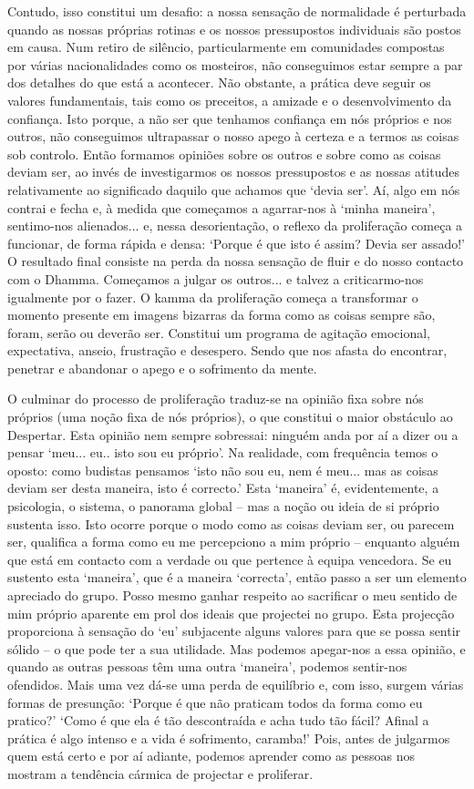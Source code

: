 Contudo, isso constitui um desafio: a nossa sensação de normalidade é perturbada quando as nossas próprias rotinas e os nossos pressupostos individuais são postos em causa. Num retiro de silêncio, particularmente em comunidades compostas por várias nacionalidades como os mosteiros, não conseguimos estar sempre a par dos detalhes do que está a acontecer. Não obstante, a prática deve seguir os valores fundamentais, tais como os preceitos, a amizade e o desenvolvimento da confiança. Isto porque, a não ser que tenhamos confiança em nós próprios e nos outros, não conseguimos ultrapassar o nosso apego à certeza e a termos as coisas sob controlo. Então formamos opiniões sobre os outros e sobre como as coisas deviam ser, ao invés de investigarmos os nossos pressupostos e as nossas atitudes relativamente ao significado daquilo que achamos que `devia ser'. Aí, algo em nós contrai e fecha e, à medida que começamos a agarrar-nos à `minha maneira', sentimo-nos alienados... e, nessa desorientação, o reflexo da proliferação começa a funcionar, de forma rápida e densa: `Porque é que isto é assim? Devia ser assado!' O resultado final consiste na perda da nossa sensação de fluir e do nosso contacto com o Dhamma. Começamos a julgar os outros... e talvez a criticarmo-nos igualmente por o fazer. O kamma da proliferação começa a transformar o momento presente em imagens bizarras da forma como as coisas sempre são, foram, serão ou deverão ser. Constitui um programa de agitação emocional, expectativa, anseio, frustração e desespero. Sendo que nos afasta do encontrar, penetrar e abandonar o apego e o sofrimento da mente.

O culminar do processo de proliferação traduz-se na opinião fixa sobre nós próprios (uma noção fixa de nós próprios), o que constitui o maior obstáculo ao Despertar. Esta opinião nem sempre sobressai: ninguém anda por aí a dizer ou a pensar `meu... eu.. isto sou eu próprio'. Na realidade, com frequência temos o oposto: como budistas pensamos `isto não sou eu, nem é meu... mas as coisas deviam ser desta maneira, isto é correcto.' Esta `maneira' é, evidentemente, a psicologia, o sistema, o panorama global -- mas a noção ou ideia de si próprio sustenta isso. Isto ocorre porque o modo como as coisas deviam ser, ou parecem ser, qualifica a forma como eu me percepciono a mim próprio -- enquanto alguém que está em contacto com a verdade ou que pertence à equipa vencedora. Se eu sustento esta `maneira', que é a maneira `correcta', então passo a ser um elemento apreciado do grupo. Posso mesmo ganhar respeito ao sacrificar o meu sentido de mim próprio aparente em prol dos ideais que projectei no grupo. Esta projecção proporciona à sensação do `eu' subjacente alguns valores para que se possa sentir sólido -- o que pode ter a sua utilidade. Mas podemos apegar-nos a essa opinião, e quando as outras pessoas têm uma outra `maneira', podemos sentir-nos ofendidos. Mais uma vez dá-se uma perda de equilíbrio e, com isso, surgem várias formas de presunção: `Porque é que não praticam todos da forma como eu pratico?' `Como é que ela é tão descontraída e acha tudo tão fácil? Afinal a prática é algo intenso e a vida é sofrimento, caramba!' Pois, antes de julgarmos quem está certo e por aí adiante, podemos aprender como as pessoas nos mostram a tendência cármica de projectar e proliferar.

